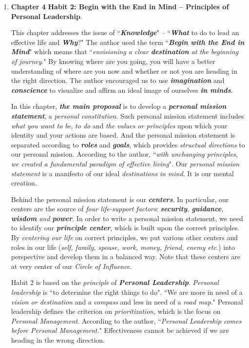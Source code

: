 \documentclass[11pt]{article}
\begin{document}
\begin{enumerate}
\begin{enumerate}
\item \textbf{Chapter 4} \textbf{Habit 2: Begin with the End in Mind -- Principles of Personal Leadership}. 

This chapter addresses the issue of ``\emph{\textbf{Knowledge}}" -- ``\emph{\textbf{What}} to do to lead an effective life and \emph{\textbf{Why}}?" The author used the term ``\emph{\textbf{Begin with the End in Mind}}" which means that ``\emph{envisioning a clear \textbf{destination} at the beginning of journey}."  By knowing where are you going, you will have a better understanding of where are you now and whether or not you are heading in the right direction. The author encouraged us to use \emph{\textbf{imagination}} and \emph{\textbf{conscience}} to visualize and affirm an ideal image of ourselves \emph{\textbf{in minds}}.  

In this chapter, \emph{\textbf{the main proposal}} is to develop a \emph{\textbf{personal mission statement}}, a \emph{personal constitution}. Such personal mission statement includes \emph{what you want to be}, \emph{to do} and \emph{the values or principles} upon which your identity and your actions are based. And the personal mission statement is separated according to \emph{\textbf{roles}} and \emph{\textbf{goals}}, which provides \emph{structual directions} to our personal mission. According to the author, ``\emph{with unchanging principles, we created a fundamental paradigm of effective living}". Our \emph{personal mission statement} is a manifesto of our ideal \emph{destinations} \emph{in mind}.  It is our mental creation.

Behind the personal mission statement is our \emph{\textbf{centers}}. In particular, our centers are the source of \emph{four life-support factors}: \emph{\textbf{security}, \textbf{guidance}, \textbf{wisdom} and \textbf{power}}. In order to write a personal mission statement, we need to identify our \emph{\textbf{principle center}}, which is built upon the correct principles. By \emph{centering our life} on correct principles, we put various other centers and roles in our life (\emph{self, family, spouse, work, money, friend, enemy etc.}) into perspective and develop them in a balanced way. Note that these centers are at very center of our \emph{Circle of Influence}. 

Habit 2 is based on the \emph{principle} of \emph{\textbf{Personal Leadership}}. \emph{Personal leadership} is ``to determine the right things to do". ``We are more in need of a \emph{vision or destination} and a \emph{compass} and less in need of a \emph{road map}." Personal leadership defines the criterion on \emph{prioritization}, which is the focus on \emph{Personal Management}. According to the author, ``\emph{Personal Leadership comes before Personal Management.}" Effectiveness cannot be achieved if we are heading in the wrong direction.


\end{enumerate}
\end{enumerate}
\end{document}
